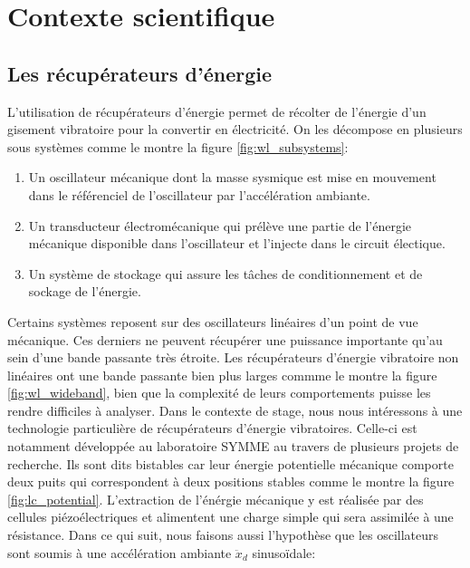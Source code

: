 \documentclass[a4paper, french, 12pt, titlepage]{article}
\begin{document}
\newpage

\section{Contexte scientifique}


\subsection{Les récupérateurs d'énergie}





L'utilisation de récupérateurs d'énergie permet de récolter de l'énergie d'un gisement vibratoire pour la convertir en électricité.
On les décompose en plusieurs sous systèmes comme le montre la figure \ref{fig:wl_subsystems}:
\begin{enumerate}
  \item Un oscillateur mécanique dont la masse sysmique est mise en mouvement dans le référenciel de l'oscillateur par l'accélération ambiante.
  \item Un transducteur électromécanique qui prélève une partie de l'énergie mécanique disponible dans l'oscillateur et l'injecte dans le circuit électique.
  \item Un système de stockage qui assure les tâches de conditionnement et de sockage de l'énergie.
\end{enumerate}

Certains systèmes reposent sur des oscillateurs linéaires d'un point de vue mécanique.
Ces derniers ne peuvent récupérer une puissance importante qu'au sein d'une bande passante très étroite.
Les récupérateurs d'énergie vibratoire non linéaires ont une bande passante bien plus larges commme le montre la figure \ref{fig:wl_wideband}, bien que la complexité de leurs comportements puisse les rendre difficiles à analyser.
Dans le contexte de stage, nous nous intéressons à une technologie particulière de récupérateurs d'énergie vibratoires.
Celle-ci est notamment développée au laboratoire SYMME au travers de plusieurs projets de recherche.
Ils sont dits bistables car leur énergie potentielle mécanique comporte deux puits qui correspondent à deux positions stables comme le montre la figure \ref{fig:lc_potential}.
L'extraction de l'énérgie mécanique y est réalisée par des cellules piézoélectriques et alimentent une charge simple qui sera assimilée à une résistance.
Dans ce qui suit, nous faisons aussi l'hypothèse que les oscillateurs sont soumis à une accélération ambiante $\ddot x_d$ sinusoïdale:
\end{document}
